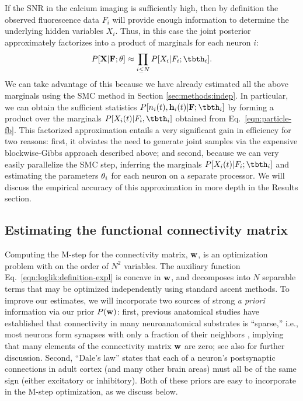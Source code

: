 If the SNR in the calcium imaging is sufficiently high, then by definition the observed fluorescence data $F_i$ will provide enough information to determine the underlying hidden variables $X_i$. Thus, in this case the joint posterior approximately factorizes into a product of marginals for each neuron $i$:
\begin{equation} \label{eqn:indep_approx}
  P[{\bf X}|{\bf F};\bth] \approx \prod_{i\leq N} P[X_i|F_i;\tbth_i].
\end{equation}
We can take advantage of this because we have already estimated all the above marginals using the SMC method in Section \ref{sec:methods:indep}. In particular, we can obtain the sufficient statistics $P[n_i(t), \bh_i(t) | \bF;\tbth_i]$ by forming a product over the marginals $P[X_i(t) | F_i,\tbth_i]$ obtained from Eq.~\eqref{eqn:particle-fb}. This factorized approximation entails a very significant gain in efficiency for two reasons: first, it obviates the need to generate joint samples via the expensive blockwise-Gibbs approach described above; and second, because we can very easily parallelize the SMC step, inferring the marginals $P[X_i(t) | F_i; \tbth_i]$ and estimating the parameters $\mathbf{\theta}_i$ for each neuron on a separate processor. We will discuss the empirical accuracy of this approximation in more depth in the Results section.

\subsection{Estimating the functional connectivity matrix} \label{sec:methods:parameters HMM}

Computing the M-step for the connectivity matrix, $\mathbf{w}$, is an optimization problem with on the order of $N^2$ variables. The auxiliary function Eq.~\eqref{eqn:loglik:definition-expl} is concave in $\mathbf{w}$, and decomposes into $N$ separable terms that may be optimized independently using standard ascent methods. To improve our estimates, we will incorporate two sources of strong \emph{a priori} information via our prior $P(\mathbf{w})$: first, previous anatomical studies have established that connectivity in many neuroanatomical substrates is ``sparse,'' i.e., most neurons form synapses with only a fraction of their neighbors \cite{Buhl94,Thompson88,Reyes98,Feldmeyer99,Gupta00,FeldmeyerSakmann00,PetersenSakmann00,Binzegger04,Song2005,Mishchenko2009b}, implying that many elements of the connectivity matrix $\mathbf{w}$ are zero; see also \cite{PAN04c,Rigat06,PILL07,Stevenson08} for further discussion. Second, ``Dale's law'' states that each of a neuron's postsynaptic connections in adult cortex (and many other brain areas) must all be of the same sign (either excitatory or inhibitory). Both of these priors are easy to incorporate in the M-step optimization, as we discuss below.


